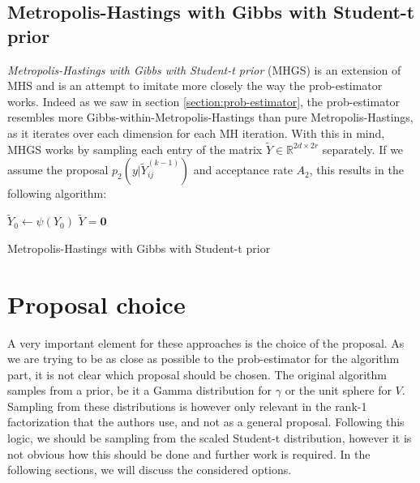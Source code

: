 \documentclass[12pt]{memoir}
\newcommand{\mb}{\mathbf}
\begin{document}
\subsection*{Metropolis-Hastings with Gibbs with Student-t prior}
\textit{Metropolis-Hastings with Gibbs with Student-t prior} (MHGS) is an extension of MHS and is an attempt to imitate more closely the way the prob-estimator works. Indeed as we saw in section \ref{section:prob-estimator}, the prob-estimator resembles more Gibbs-within-Metropolis-Hastings than pure Metropolis-Hastings, as it iterates over each dimension for each MH iteration. With this in mind, MHGS works by sampling each entry of the matrix $\tilde Y \in \mathbb{R}^{2d\times 2r}$ separately. If we assume the proposal $p_2(y|\tilde Y^{(k-1)}_{ij})$ and acceptance rate $A_2$, this results in the following algorithm:\medbreak

\begin{algorithm}[H]
    \DontPrintSemicolon

    $\tilde Y_0 \gets \psi(Y_0)$\;
    $\tilde Y = \mb 0$\;
    \caption{Metropolis-Hastings with Gibbs with Student-t prior}
\end{algorithm}\medbreak

\section{Proposal choice}\label{section:proposal-choice}
A very important element for these approaches is the choice of the proposal. As we are trying to be as close as possible to the prob-estimator for the algorithm part, it is not clear which proposal should be chosen. The original algorithm samples from a prior, be it a Gamma distribution for $\gamma$ or the unit sphere for $V$. Sampling from these distributions is however only relevant in the rank-1 factorization that the authors use, and not as a general proposal. Following this logic, we should be sampling from the scaled Student-t distribution, however it is not obvious how this should be done and further work is required. In the following sections, we will discuss the considered options.
\end{document}
